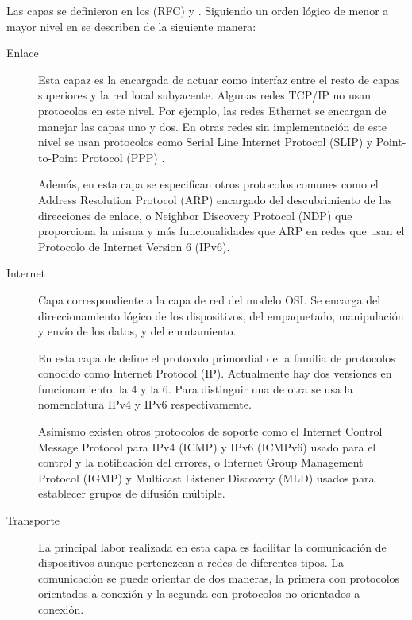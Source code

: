 Las capas se definieron en los  (RFC)
\cite{rfc1122} y \cite{rfc1123}. Siguiendo un orden lógico de menor a mayor
nivel en \cite{kozierok2005} se describen de la siguiente manera:
\begin{description}
  \item[Enlace] Esta capaz es la encargada de actuar como interfaz entre el
  resto de capas superiores y la red local subyacente. Algunas redes TCP/IP no 
  usan protocolos en este nivel. Por ejemplo, las redes Ethernet se encargan de
  manejar las capas uno y dos. En otras redes sin implementación de este nivel
  se usan protocolos como Serial Line Internet Protocol (SLIP) \cite{rfc1055} y
  Point-to-Point Protocol (PPP) \cite{rfc1661}.

  Además, en esta capa se especifican otros protocolos comunes como el Address
  Resolution Protocol (ARP) \cite{rfc826} encargado del descubrimiento de las
  direcciones de enlace, o Neighbor Discovery Protocol (NDP) \cite{rfc4861} que
  proporciona la misma y más funcionalidades que ARP en redes que usan el
  Protocolo de Internet Version 6 (IPv6).

  \item[Internet] Capa correspondiente a la capa de red del modelo OSI. Se
  encarga del direccionamiento lógico de los dispositivos, del empaquetado,
  manipulación y envío de los datos, y del enrutamiento.
  
  En esta capa de define el protocolo primordial de la familia de protocolos
  conocido como Internet Protocol (IP). Actualmente hay dos versiones en
  funcionamiento, la 4 y la 6. Para distinguir una de otra se usa la
  nomenclatura IPv4 \cite{rfc791} y IPv6 \cite{rfc2460} respectivamente.

  Asimismo existen otros protocolos de soporte como el Internet Control Message
  Protocol para IPv4 (ICMP) \cite{rfc792} y IPv6 (ICMPv6) \cite{rfc4443} usado
  para el control y la notificación del errores, o Internet Group Management
  Protocol (IGMP) \cite{rfc4604} y Multicast Listener Discovery (MLD)
  \cite{rfc4604} usados para establecer grupos de difusión múltiple.

  \item[Transporte] La principal labor realizada en esta capa es facilitar
  la comunicación de dispositivos aunque pertenezcan a redes de diferentes
  tipos. La comunicación se puede orientar de dos maneras, la primera con
  protocolos orientados a conexión y la segunda con protocolos no orientados
  a conexión.


\end{description}
